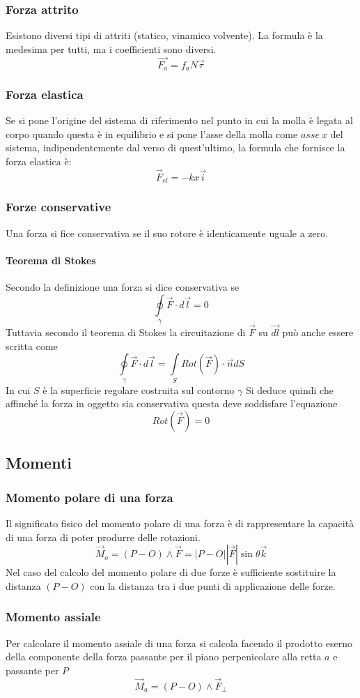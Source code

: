 \documentclass[12pt,a4paper]{report}
\begin{document}
	\subsubsection{Forza attrito}
Esistono diversi tipi di attriti (statico, vinamico volvente). La formula è la medesima per tutti, ma i coefficienti sono diversi.
	\[\vec{F_{a}}=f_{a}N\vec{\tau}\]
	\subsubsection{Forza elastica}
Se si pone l'origine del sistema di riferimento nel punto in cui la molla è legata al corpo quando questa è in equilibrio e si pone l'asse della molla come $asse~x$ del sistema, indipendentemente dal verso di quest'ultimo, la formula che fornisce la forza elastica è:
	\[\vec{F}_{el}=-kx \vec{i} \]
	\subsubsection{Forze conservative}
Una forza si fice conservativa se il suo rotore è identicamente uguale a zero.
		\paragraph{Teorema di Stokes}
	Secondo la definizione una forza si dice conservativa se 
			\[\oint\limits_{\gamma} \vec{F}\cdot d\vec{l}=0\]
	Tuttavia secondo il teorema di Stokes la circuitazione di $\vec{F}$ su $\vec{dl}$ può anche essere scritta come
			\[ \oint\limits_{\gamma} \vec{F}\cdot d\vec{l} = \int\limits_{S} Rot( \vec{F} )\cdot\vec{n}dS\] 
In cui $S$ è la superficie regolare costruita sul contorno $\gamma$ 
	Si deduce quindi che affinché la forza in oggetto sia conservativa questa deve soddisfare l'equazione
			\[Rot(\vec{F})=0\]
	\subsection{Momenti}
		\subsubsection{Momento polare di una forza}
Il significato fisico del momento polare di una forza è di rappresentare la capacità di una forza di poter produrre delle rotazioni.
		\[\vec{M}_{o} = (P-O)\wedge\vec{F}=|P-O||\vec{F}|\sin\theta\vec{k}\]
Nel caso del calcolo del momento polare di due forze è sufficiente sostituire la distanza $(P-O)$ con la distanza tra i due punti di applicazione delle forze.
		\subsubsection{Momento assiale}
Per calcolare il momento assiale di una forza si calcola facendo il prodotto eserno della componente della forza passante per il piano perpenicolare alla retta $a$ e passante per $P$
		\[\vec{M}_{a} = (P-O)\wedge\vec{F}_{\perp}\]
\end{document}

